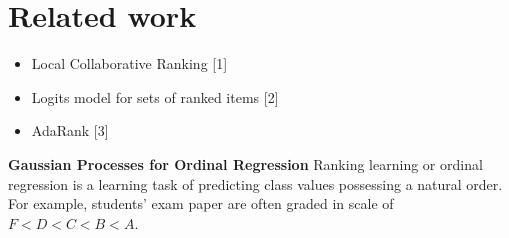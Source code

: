 \section{Related work}
\label{sec:related}

	\begin{itemize}

	\item Local Collaborative Ranking [1]

	\item Logits model for sets of ranked items [2]

	\item AdaRank [3]
	\end{itemize}

\textbf{Gaussian Processes for Ordinal Regression}
Ranking learning or ordinal regression is a learning task of predicting class values possessing a natural order. For example, students' exam paper are often graded in scale of $F < D < C < B < A$. 

